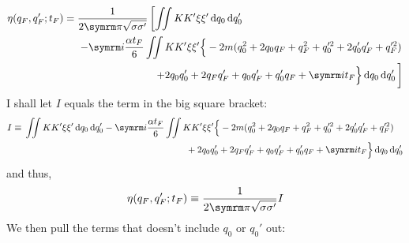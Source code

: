 \begin{align}
    \eta(q_F, q_F'; t_F) &= \begin{multlined}[t]
        \frac{1}{2\cpi\sqrt{\sigma\sigma'}}\left[\iint KK'\xi\xi'\dd{q_0}\dd{q_0'} \right.\\ \left.
        - \im\frac{\alpha t_F}{6}\iint KK'\xi\xi'\Big\{-2m(q_0^2 + 2q_0q_F + q_F^2 + q_0'^2 + 2q_0'q_F' + q_F'^2) \right.\\ \left.
        + 2q_0q_0' + 2q_Fq_F' + q_0q_F' + q_0'q_F + \im t_F\Big\}\dd{q_0}\dd{q_0'}  \vphantom{\iint}\right]
    \end{multlined} \\
\end{align}
I shall let $I$ equals the term in the big square bracket:
\begin{equation}
    I \equiv \begin{multlined}[t]
        \iint KK'\xi\xi'\dd{q_0}\dd{q_0'}
        - \im\frac{\alpha t_F}{6}\iint KK'\xi\xi'\Big\{-2m(q_0^2 + 2q_0q_F + q_F^2 + q_0'^2 + 2q_0'q_F' + q_F'^2) \\
        + 2q_0q_0' + 2q_Fq_F' + q_0q_F' + q_0'q_F + \im t_F\Big\}\dd{q_0}\dd{q_0'}
    \end{multlined}
\end{equation}
and thus,
\begin{equation}
    \eta(q_F, q_F'; t_F) \equiv \frac{1}{2\cpi\sqrt{\sigma\sigma'}}I 
\end{equation}
We then pull the terms that doesn't include $q_0$ or $q_0'$ out:
